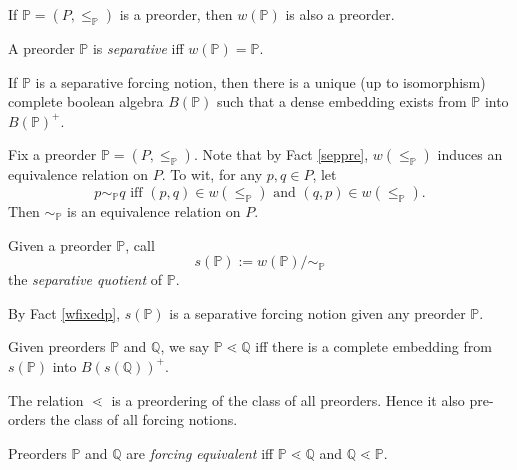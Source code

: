 \documentclass[12pt]{article}
\numberwithin{equation}{section}
\begin{document}
\begin{fact}\label{seppre}
If $\mathbb{P} = (P, \leq_{\mathbb{P}})$ is a preorder, then $w(\mathbb{P})$ is also a preorder.
\end{fact}

\begin{defi}
A preorder $\mathbb{P}$ is \emph{separative} iff $w(\mathbb{P}) = \mathbb{P}$.
\end{defi}

\begin{fact}\label{bcompletion}
If $\mathbb{P}$ is a separative forcing notion, then there is a unique (up to isomorphism) complete boolean algebra $B(\mathbb{P})$ such that a dense embedding exists from $\mathbb{P}$ into $B(\mathbb{P})^+$.
\end{fact}

Fix a preorder $\mathbb{P} = (P, \leq_{\mathbb{P}})$. Note that by Fact \ref{seppre}, $w(\leq_{\mathbb{P}})$ induces an equivalence relation on $P$. To wit, for any $p, q \in P$, let $$p \sim_{\mathbb{P}} q \text{ iff } (p, q) \in w(\leq_{\mathbb{P}}) \text{ and } (q, p) \in w(\leq_{\mathbb{P}}) \text{.}$$ Then $\sim_{\mathbb{P}}$ is an equivalence relation on $P$. 

\begin{defi}
Given a preorder $\mathbb{P}$, call $$s(\mathbb{P}) := w(\mathbb{P}) / \sim_{\mathbb{P}}$$ the \emph{separative quotient} of $\mathbb{P}$.
\end{defi}

\begin{rem}
By Fact \ref{wfixedp}, $s(\mathbb{P})$ is a separative forcing notion given any preorder $\mathbb{P}$.
\end{rem}

\begin{defi}
Given preorders $\mathbb{P}$ and $\mathbb{Q}$, we say $\mathbb{P} \lessdot \mathbb{Q}$ iff there is a complete embedding from $s(\mathbb{P})$ into $B(s(\mathbb{Q}))^+$.
\end{defi}

\begin{fact}\label{forpre}
The relation $\lessdot$ is a preordering of the class of all preorders. Hence it also pre-orders the class of all forcing notions.
\end{fact}

\begin{defi}\label{comdef}
Preorders $\mathbb{P}$ and $\mathbb{Q}$ are \emph{forcing equivalent} iff $\mathbb{P} \lessdot \mathbb{Q}$ and $\mathbb{Q} \lessdot \mathbb{P}$.
\end{defi}
\end{document}
